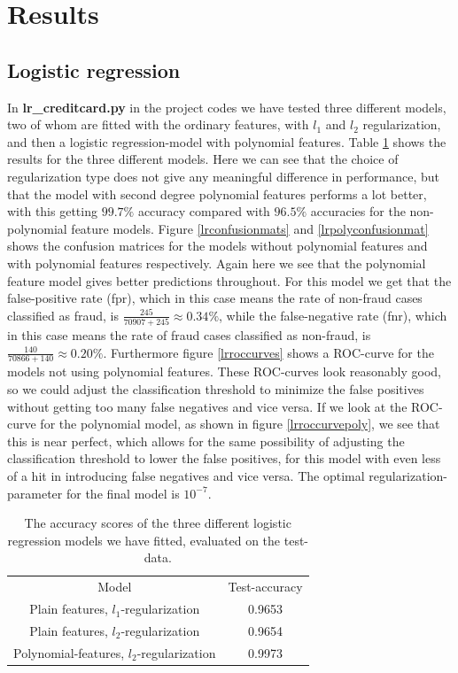 \documentclass{article}
\begin{document}
\section{Results}
\subsection{Logistic regression}
In \textbf{lr\_creditcard.py} in the project codes \cite{githubrepoproject3} we
have tested three different models, two of whom are fitted with the ordinary
features, with $l_1$ and $l_2$ regularization, and then a logistic
regression-model with polynomial features. Table \ref{lrresults} shows the
results for the three different models. Here we can see that the choice of
regularization type does not give any meaningful difference in performance, but
that the model with second degree polynomial features performs a lot better,
with this getting $99.7\%$ accuracy compared with $96.5\%$ accuracies for the
non-polynomial feature models. Figure \ref{lrconfusionmats} and
\ref{lrpolyconfusionmat} shows the confusion matrices for the models without
polynomial features and with polynomial features respectively. Again here we see
that the polynomial feature model gives better predictions throughout. For this
model we get that the false-positive rate (fpr), which in this case means the
rate of non-fraud cases classified as fraud, is $\frac{245}{70907+245} \approx
	0.34\%$, while the false-negative rate (fnr), which in this case means the rate
of fraud cases classified as non-fraud, is $\frac{140}{70866 + 140} \approx
	0.20\%$. Furthermore figure \ref{lrroccurves} shows a ROC-curve for the models
not using polynomial features. These ROC-curves look reasonably good, so we
could adjust the classification threshold to minimize the false positives
without getting too many false negatives and vice versa. If we look at the
ROC-curve for the polynomial model, as shown in figure \ref{lrroccurvepoly}, we
see that this is near perfect, which allows for the same possibility of
adjusting the classification threshold to lower the false positives, for this
model with even less of a hit in introducing false negatives and vice versa. The
optimal regularization-parameter for the final model is $10^{-7}$.


\begin{table}
	\centering
	\begin{tabular}{| c | c |}
		Model                                     & Test-accuracy \\
		Plain features, $l_1$-regularization      & 0.9653        \\
		Plain features, $l_2$-regularization      & 0.9654        \\
		Polynomial-features, $l_2$-regularization & 0.9973
	\end{tabular}
	\caption{The accuracy scores of the three different logistic regression
		models we have fitted, evaluated on the test-data.}
	\label{lrresults}
\end{table}
\end{document}
